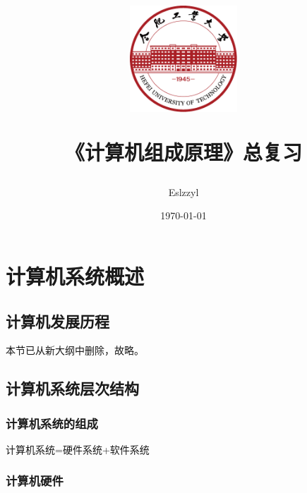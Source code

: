 \documentclass[12pt, a4paper, oneside]{ctexart}
\title{
    \includegraphics[width=0.3\textwidth]{images/hfut-badge.pdf}
    
    \vspace{20pt}
    《计算机组成原理》总复习
}
\author{Eslzzyl}
\date{\today}
\begin{document}
\maketitle
\newpage
\tableofcontents
\vspace{20pt}

\newpage

\section{计算机系统概述}

\subsection{计算机发展历程}

本节已从新大纲中删除，故略。

\subsection{计算机系统层次结构}

\subsubsection{计算机系统的组成}

计算机系统=硬件系统+软件系统

\subsubsection{计算机硬件}
\end{document}
